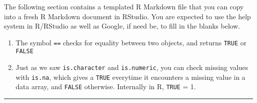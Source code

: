 \documentclass[
]{article}
\providecommand{\tightlist}{%
  \setlength{\itemsep}{0pt}\setlength{\parskip}{0pt}}
\begin{document}
The following section contains a templated R Markdown file that you can
copy into a fresh R Markdown document in RStudio. You are expected to
use the help system in R/RStudio as well as Google, if need be, to fill
in the blanks below.

\begin{infobox}

\begin{enumerate}
\def\labelenumi{\arabic{enumi}.}
\tightlist
\item
  The symbol \texttt{==} checks for equality between two objects, and
  returns \texttt{TRUE} or \texttt{FALSE}
\item
  Just as we saw \texttt{is.character} and \texttt{is.numeric}, you can
  check missing values with \texttt{is.na}, which gives a \texttt{TRUE}
  everytime it encounters a missing value in a data array, and
  \texttt{FALSE} otherwise. Internally in R, \texttt{TRUE} = 1.
\end{enumerate}

\end{infobox}

\begin{center}\rule{0.5\linewidth}{0.5pt}\end{center}
\end{document}
